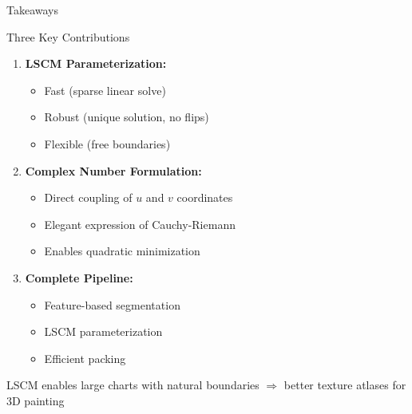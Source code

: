 \documentclass[aspectratio=169]{beamer}
\begin{document}
\begin{frame}{Takeaways}

\begin{block}{Three Key Contributions}
\begin{enumerate}
  \item \textbf{LSCM Parameterization:}
  \begin{itemize}
    \item Fast (sparse linear solve)
    \item Robust (unique solution, no flips)
    \item Flexible (free boundaries)
  \end{itemize}

  \item \textbf{Complex Number Formulation:}
  \begin{itemize}
    \item Direct coupling of $u$ and $v$ coordinates
    \item Elegant expression of Cauchy-Riemann
    \item Enables quadratic minimization
  \end{itemize}

  \item \textbf{Complete Pipeline:}
  \begin{itemize}
    \item Feature-based segmentation
    \item LSCM parameterization
    \item Efficient packing
  \end{itemize}
\end{enumerate}
\end{block}

\vspace{0.5em}
LSCM enables \alert{large charts with natural boundaries} $\Rightarrow$ better texture atlases for 3D painting

\end{frame}
\end{document}
